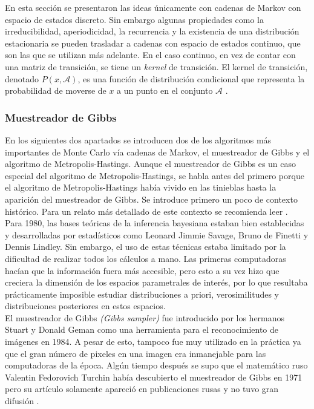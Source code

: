 \documentclass[11pt,a4paper]{article}
\begin{document}
En esta sección se presentaron las ideas únicamente con cadenas de Markov con espacio de estados discreto. Sin embargo algunas propiedades como la irreducibilidad, aperiodicidad, la recurrencia y la existencia de una distribución estacionaria se pueden trasladar a cadenas con espacio de estados continuo, que son las que se utilizan más adelante. En el caso continuo, en vez de contar con una matriz de transición, se tiene un \textit{kernel} de transición. El kernel de transición, denotado $P(x, \mathcal{A})$, es una función de distribución condicional que representa la probabilidad de moverse de $x$ a un punto en el conjunto $\mathcal{A}$ \citep{chib_mh}.\\

\subsubsection*{Muestreador de Gibbs}
En los siguientes dos apartados se introducen dos de los algoritmos más importantes de Monte Carlo vía cadenas de Markov, el muestreador de Gibbs y el algoritmo de Metropolis-Hastings. Aunque el muestreador de Gibbs es un caso especial del algoritmo de Metropolis-Hastings, se habla antes del primero porque el algoritmo de Metropolis-Hastings había vivido en las tinieblas hasta la aparición del muestreador de Gibbs. Se introduce primero un poco de contexto histórico. Para un relato más detallado de este contexto se recomienda leer \citet{bertsch}.\\

Para 1980, las bases teóricas de la inferencia bayesiana estaban bien establecidas y desarrolladas por estadísticos como Leonard Jimmie Savage, Bruno de Finetti y Dennis Lindley. Sin embargo, el uso de estas técnicas estaba limitado por la dificultad de realizar todos los cálculos a mano. Las primeras computadoras hacían que la información fuera más accesible, pero esto a su vez hizo que creciera la dimensión de los espacios parametrales de interés, por lo que resultaba prácticamente imposible estudiar distribuciones a priori, verosimilitudes y distribuciones posteriores en estos espacios.\\

El muestreador de Gibbs \textit{(Gibbs sampler)} fue introducido por los hermanos Stuart y Donald Geman como una herramienta para el reconocimiento de imágenes en 1984. A pesar de esto, tampoco fue muy utilizado en la práctica ya que el gran número de pixeles en una imagen era inmanejable para las computadoras de la época. Algún tiempo después se supo que el matemático ruso Valentin Fedorovich Turchin había descubierto el muestreador de Gibbs en 1971 pero su artículo solamente apareció en publicaciones rusas y no tuvo gran difusión \citep{bertsch}.\\
\end{document}
